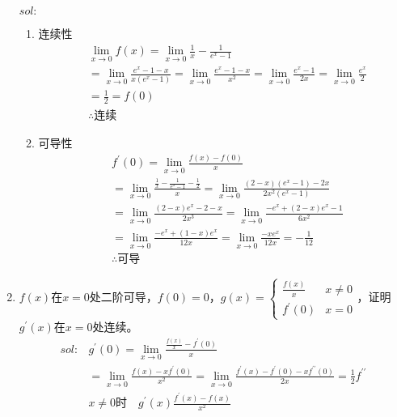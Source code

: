 \begin{enumerate}[{例}1.]
            $sol:$
            \begin{enumerate}[(1)]
                \item 连续性
                    \begin{align*}
                        &\lim_{x\to 0}f(x)=\lim_{x\to 0}\frac{1}{x}-\frac{1}{e^x-1}\\
                        &=\lim_{x\to 0}\frac{e^x-1-x}{x(e^x-1)}=\lim_{x\to 0}\frac{e^x-1-x}{x^2}=\lim_{x\to 0}\frac{e^x-1}{2x}=\lim_{x\to 0}\frac{e^x}{2}\\
                        &=\frac{1}{2}=f(0)\\
                        &\therefore\mbox{连续}
                    \end{align*}
                \item 可导性
                    \begin{align*}
                        &f^{\prime}(0)=\lim_{x\to 0}\frac{f(x)-f(0)}{x}\\
                        &=\lim_{x\to 0}\frac{\frac{1}{x}-\frac{1}{e^x-1}-\frac{1}{2}}{x}=\lim_{x\to 0}\frac{(2-x)(e^x-1)-2x}{2x^2(e^x-1)}\\
                        &=\lim_{x\to 0}\frac{(2-x)e^x-2-x}{2x^3}=\lim_{x\to 0}\frac{-e^x+(2-x)e^x-1}{6x^2}\\
                        &=\lim_{x\to 0}\frac{-e^x+(1-x)e^x}{12x}=\lim_{x\to 0}\frac{-xe^x}{12x}=-\frac{1}{12}\\
                        &\therefore\mbox{可导}
                    \end{align*}
            \end{enumerate}
    \item $f(x)$在$x=0$处二阶可导，$f(0)=0$，$g(x)=\begin{cases}\frac{f(x)}{x} & x \neq 0\\
                                                                f^{\prime}(0) & x = 0
                                                            \end{cases}$，证明$g^{\prime}(x)$在$x=0$处连续。
            \begin{align*}
                sol:&g^{\prime}(0)=\lim_{x\to 0}\frac{\frac{f(x)}{x}-f^{\prime}(0)}{x}\\
                    &=\lim_{x\to 0}\frac{f(x)-xf^{\prime}(0)}{x^2}=\lim_{x\to 0}\frac{f^{\prime}(x)-f^{\prime}(0)-xf^{\prime\prime}(0)}{2x}=\frac{1}{2}f^{\prime\prime}\\
                    &x\neq 0\mbox{时}\quad g^{\prime}(x)\frac{f^{\prime}(x)-f(x)}{x^2}\\

\end{align*}
\end{enumerate}
